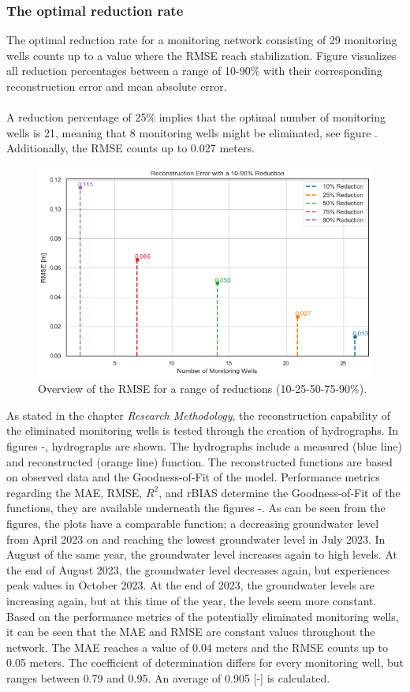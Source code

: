 \subsubsection{The optimal reduction rate}
The optimal reduction rate for a monitoring network consisting of 29 monitoring wells counts up to a value where the RMSE reach stabilization. Figure  visualizes all reduction percentages between a range of 10-90\% with their corresponding reconstruction error and mean absolute error. \\
\\
A reduction percentage of 25\% implies that the optimal number of monitoring wells is 21, meaning that 8 monitoring wells might be eliminated, see figure . Additionally, the RMSE counts up to 0.027 meters. 
\begin{figure}[htbp]
    \centering
    \includegraphics[width=0.5\linewidth]{frontmatter/Rozenburg-fig/rmseroz.png}
    \caption{Overview of the RMSE for a range of reductions (10-25-50-75-90\%). }
    \label{rmse}
\end{figure}
As stated in the chapter \textit{Research Methodology}, the reconstruction capability of the eliminated monitoring wells is tested through the creation of hydrographs. In figures -, hydrographs are shown. The hydrographs include a measured (blue line) and reconstructed (orange line) function. The reconstructed functions are based on observed data and the Goodness-of-Fit of the model. Performance metrics regarding the MAE, RMSE, $R^2$, and rBIAS determine the Goodness-of-Fit of the functions, they are available underneath the figures -. 
\newpage
\noindent
As can be seen from the figures, the plots have a comparable function; a decreasing groundwater level from April 2023 on and reaching the lowest groundwater level in July 2023. In August of the same year, the groundwater level increases again to high levels. At the end of August 2023, the groundwater level decreases again, but experiences peak values in October 2023. At the end of 2023, the groundwater levels are increasing again, but at this time of the year, the levels seem more constant. Based on the performance metrics of the potentially eliminated monitoring wells, it can be seen that the MAE and RMSE are constant values throughout the network. The MAE reaches a value of 0.04 meters and the RMSE counts up to 0.05 meters. The coefficient of determination differs for every monitoring well, but ranges between 0.79 and 0.95. An average of 0.905 [-] is calculated.
